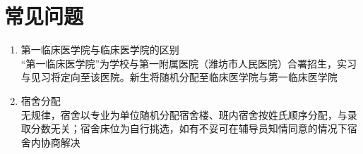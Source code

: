 \section[常见问题]{常见问题}
\begin{enumerate}
    \item 第一临床医学院与临床医学院的区别\\
          “第一临床医学院”为学校与第一附属医院（潍坊市人民医院）合署招生，实习与见习将定向至该医院。新生将随机分配至临床医学院与第一临床医学院
    \item 宿舍分配\label{random_allocation}\\
          无规律，宿舍以专业为单位随机分配宿舍楼、班内宿舍按姓氏顺序分配，与录取分数无关；宿舍床位为自行挑选，如有不妥可在辅导员知情同意的情况下宿舍内协商解决
\end{enumerate}
